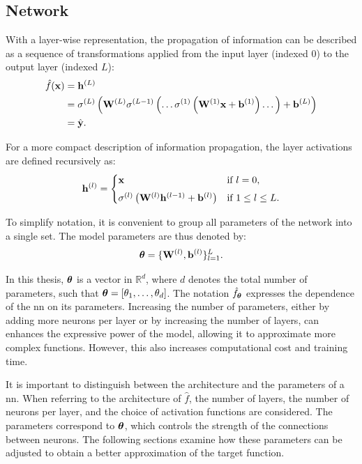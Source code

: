 \subsection{Network}

With a layer-wise representation, the propagation of information can be described as a sequence of transformations applied from the input layer (indexed $0$) to the output layer (indexed $L$):
\begin{equation}
\begin{split}
\hat{f}(\vect{x}) &= \latentRepresentation[L] \\
&= \sigma^{(L)}\left(\mat{W}^{(L)} \sigma^{(L-1)}\left(\dots \sigma^{(1)}\left(\mat{W}^{(1)} \vect{x} + \vect{b}^{(1)}\right) \dots \right) + \vect{b}^{(L)}\right) \\
&= \hat{\vect{y}}.
\end{split}
\label{eq:network_full}
\end{equation}

For a more compact description of information propagation, the layer activations are defined recursively as:
\begin{equation}
\latentRepresentation[l] =
\begin{cases}
\vect{x} & \text{if } l = 0,\\[4pt]
\sigma^{(l)}\left(\mat{W}^{(l)} \latentRepresentation[l-1] + \vect{b}^{(l)}\right) & \text{if } 1 \le l \le L.
\end{cases}
\label{eq:layer_recursive}
\end{equation}

To simplify notation, it is convenient to group all parameters of the network into a single set.
The model parameters are thus denoted by:
\begin{equation}
\boldsymbol{\theta} = \{\mathbf{W}^{(l)}, \mathbf{b}^{(l)}\}_{l=1}^{L}.
\label{eq:parameters}
\end{equation}

In this thesis, $\boldsymbol{\theta}$ is a vector in $\mathbb{R}^d$, where $d$ denotes the total number of parameters, such that $\boldsymbol{\theta} = [\theta_1, \dots, \theta_d]$.
The notation $\hat{f}_{\boldsymbol{\theta}}$ expresses the dependence of the \gls{nn} on its parameters.
Increasing the number of parameters, either by adding more neurons per layer or by increasing the number of layers, can enhances the expressive power of the model, allowing it to approximate more complex functions.
However, this also increases computational cost and training time.

It is important to distinguish between the architecture and the parameters of a \gls{nn}.
When referring to the architecture of $\hat{f}$, the number of layers, the number of neurons per layer, and the choice of activation functions are considered.
The parameters correspond to $\boldsymbol{\theta}$, which controls the strength of the connections between neurons.
The following sections examine how these parameters can be adjusted to obtain a better approximation of the target function.
